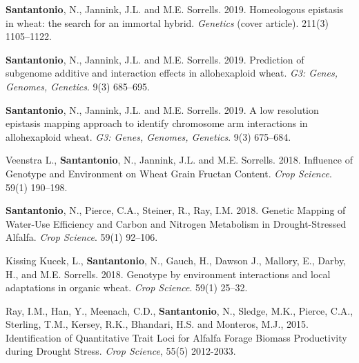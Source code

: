 \documentclass[10pt]{article}
\begin{document}
\begin{bibenum}


    \item \textbf{Santantonio}, N., Jannink, J.L. and M.E. Sorrells. 2019. Homeologous epistasis in wheat: the search for an immortal hybrid. \emph{Genetics} (cover article). 211(3) 1105--1122. \\ 

    \item \textbf{Santantonio}, N., Jannink, J.L. and M.E. Sorrells. 2019. Prediction of subgenome additive and interaction effects in allohexaploid wheat. \emph{G3: Genes, Genomes, Genetics}. 9(3) 685--695.  
    
    \item \textbf{Santantonio}, N., Jannink, J.L. and M.E. Sorrells. 2019. A low resolution epistasis mapping approach to identify chromosome arm interactions in allohexaploid wheat. \emph{G3: Genes, Genomes, Genetics}. 9(3) 675--684. 

    \item Veenstra L., \textbf{Santantonio}, N., Jannink, J.L. and M.E. Sorrells. 2018. Influence of Genotype and Environment on Wheat Grain Fructan Content. \emph{Crop Science}. 59(1) 190--198. 
    
    \item \textbf{Santantonio}, N., Pierce, C.A., Steiner, R., Ray, I.M. 2018. Genetic Mapping of Water-Use Efficiency and Carbon and Nitrogen Metabolism in Drought-Stressed Alfalfa. \emph{Crop Science}. 59(1) 92--106. 

    \item Kissing Kucek, L., \textbf{Santantonio}, N., Gauch, H., Dawson J., Mallory, E., Darby, H., and M.E. Sorrells. 2018. Genotype by environment interactions and local adaptations in organic wheat. \emph{Crop Science}. 59(1) 25--32. 

    \item Ray, I.M., Han, Y., Meenach, C.D., \textbf{Santantonio}, N., Sledge, M.K., Pierce, C.A., Sterling, T.M., Kersey, R.K., Bhandari, H.S. and Monteros, M.J., 2015. Identification of Quantitative Trait Loci for Alfalfa Forage Biomass Productivity during Drought Stress. \emph{Crop Science}, 55(5) 2012-2033.    

\end{bibenum}
\end{document}
